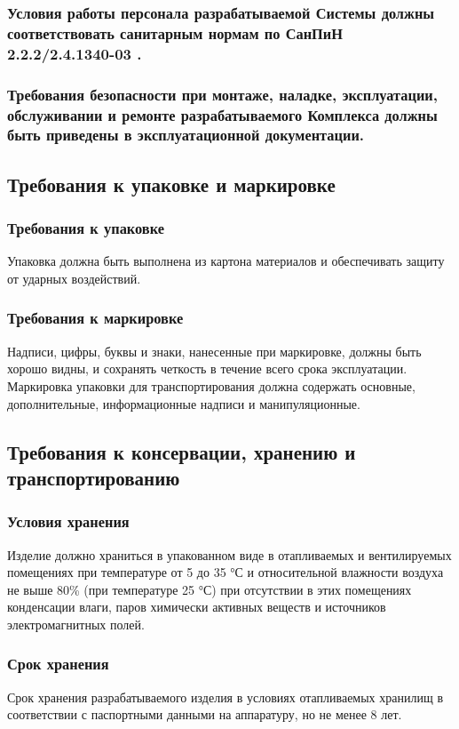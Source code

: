 			\subsubsection{Условия работы персонала разрабатываемой Системы должны соответствовать санитарным нормам по СанПиН 2.2.2/2.4.1340-03 \cite{sanpin}.}
			\subsubsection{Требования безопасности при монтаже, наладке, эксплуатации, обслуживании и ремонте разрабатываемого Комплекса должны быть приведены в эксплуатационной документации.}
		\subsection{Требования к упаковке и маркировке}
			\subsubsection{Требования к упаковке}
				Упаковка должна быть выполнена из картона материалов и обеспечивать защиту от ударных воздействий.
			\subsubsection{Требования к маркировке}
				Надписи, цифры, буквы и знаки, нанесенные при маркировке, должны быть хорошо видны, и сохранять четкость в течение всего срока эксплуатации.
				Маркировка упаковки для транспортирования должна содержать основные, дополнительные, информационные надписи и манипуляционные.
		\subsection{Требования к консервации, хранению и транспортированию}
			\subsubsection{Условия хранения}
				Изделие должно храниться в упакованном виде в отапливаемых и вентилируемых помещениях при температуре от 5 до 35 °С и относительной влажности воздуха не выше 80\% (при температуре 25 °С) при отсутствии в этих помещениях конденсации влаги, паров химически активных веществ и источников электромагнитных полей.
			\subsubsection{Срок хранения}
				Срок хранения разрабатываемого изделия в условиях отапливаемых хранилищ в соответствии с паспортными данными на аппаратуру, но не менее 8 лет.
